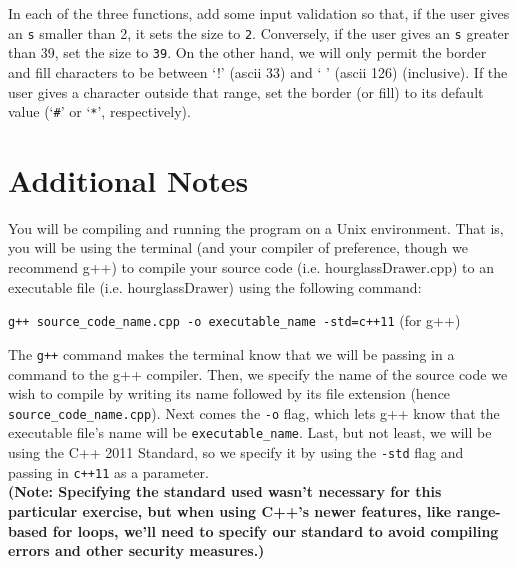 \documentclass[11 pt]{article}
\begin{document}
In each of the three functions, add some input validation so that, if the user gives an \texttt{s} smaller than 2, it sets the size to \texttt{2}. Conversely, if the user gives an \texttt{s} greater than 39, set the size to \texttt{39}. On the other hand, we will only permit the border and fill characters to be between `!' (ascii 33) and ` ' (ascii 126) (inclusive). If the user gives a character outside that range, set the border (or fill) to its default value (`\texttt{\#}' or `\texttt{*}', respectively).

\section{Additional Notes}

You will be compiling and running the program on a Unix environment. That is, you will be using the terminal (and your compiler of preference, though we recommend g++) to compile your source code (i.e. hourglassDrawer.cpp) to an executable file (i.e. hourglassDrawer) using the following command:

\begin{center}
    \texttt{g++ source\_code\_name.cpp -o executable\_name -std=c++11} (for g++)\newline
\end{center}

\noindent The \texttt{g++} command makes the terminal know that we will be passing in a command to the g++ compiler. Then, we specify the name of the source code we wish to compile by writing its name followed by its file extension (hence \texttt{source\_code\_name.cpp}). Next comes the \texttt{-o} flag, which lets g++ know that the executable file's name will be \texttt{executable\_name}. Last, but not least, we will be using the C++ 2011 Standard, so we specify it by using the \texttt{-std} flag and passing in \texttt{c++11} as a parameter. \\

\noindent \textbf{(Note: Specifying the standard used wasn't necessary for this particular exercise, but when using C++'s newer features, like range-based for loops, we'll need to specify our standard to avoid compiling errors and other security measures.)}
\end{document}

